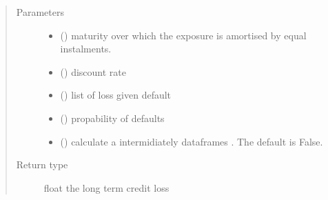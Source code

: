 \documentclass[letterpaper,10pt,english]{sphinxmanual}
\begin{document}
\begin{fulllineitems}
\label{\detokenize{unsorted/model_ifrs9:model_ifrs9.lt_ifrs9}}
\pysigstartsignatures
{}
\pysigstopsignatures\begin{quote}\begin{description}
\item[{Parameters}] \leavevmode\begin{itemize}
\item {} 
\sphinxAtStartPar
{} () \textendash{} maturity over which the exposure is amortised \sphinxhyphen{} by equal instalments.

\item {} 
\sphinxAtStartPar
{} () \textendash{} discount rate

\item {} 
\sphinxAtStartPar
{} () \textendash{} list of loss given default

\item {} 
\sphinxAtStartPar
{} () \textendash{} propability of defaults

\item {} 
\sphinxAtStartPar
{} (\sphinxstyleliteralemphasis{\sphinxupquote{, }}) \textendash{} calculate a intermidiately dataframes . The default is False.

\end{itemize}

\item[{Return type}] \leavevmode
\sphinxAtStartPar
float the long term credit loss

\end{description}\end{quote}

\end{fulllineitems}
\end{document}
